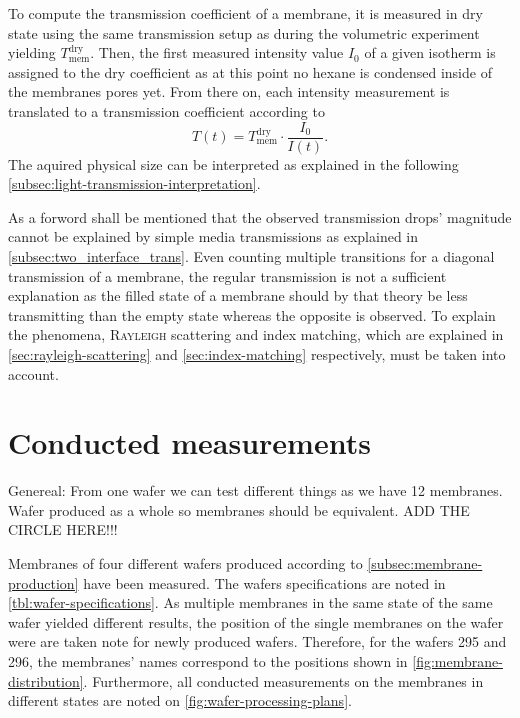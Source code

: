 \documentclass[../thesis.tex]{subfiles}
\begin{document}
          To compute the transmission coefficient of a membrane, it is measured in dry state using the same transmission setup as during the volumetric experiment yielding $T_\mathrm{mem}^\mathrm{dry}$. Then, the first measured intensity value $I_0$ of a given isotherm is assigned to the dry coefficient as at this point no hexane is condensed inside of the membranes pores yet. From there on, each intensity measurement is translated to a transmission coefficient according to
          \begin{equation}
              T(t) = T_\mathrm{mem}^\mathrm{dry} \cdot \frac{I_0}{I(t)}.
          \end{equation}
          The aquired physical size can be interpreted as explained in the following  \cref{subsec:light-transmission-interpretation}.

          As a forword shall be mentioned that the observed transmission drops' magnitude cannot be explained by simple media transmissions as explained in \cref{subsec:two_interface_trans}. Even counting multiple transitions for a diagonal transmission of a membrane, the regular transmission is not a sufficient explanation as the filled state of a membrane should by that theory be less transmitting than the empty state whereas the opposite is observed. To explain the phenomena, \textsc{Rayleigh} scattering and index matching, which are explained in \cref{sec:rayleigh-scattering} and \cref{sec:index-matching} respectively, must be taken into account.


      \section{Conducted measurements}
      \label{sec:conducted-measurements}

        

        Genereal: From one wafer we can test different things as we have 12 membranes. Wafer produced as a whole so membranes should be equivalent. ADD THE CIRCLE HERE!!!
        \medskip

        Membranes of four different wafers produced according to \cref{subsec:membrane-production} have been measured. The wafers specifications are noted in \cref{tbl:wafer-specifications}. As multiple membranes in the same state of the same wafer yielded different results, the position of the single membranes on the wafer were are taken note for newly produced wafers. Therefore, for the wafers 295 and 296, the membranes' names correspond to the positions shown in \cref{fig:membrane-distribution}. Furthermore, all conducted measurements on the membranes in different states are noted on \cref{fig:wafer-processing-plans}.
\end{document}
